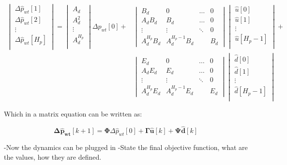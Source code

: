 \begin{align}
	\begin{vmatrix}
\Delta \hat p_{wt}[1] \\ 
\Delta \hat p_{wt}[2]\\ 
\vdots \\ 
\Delta \hat p_{wt}[H_p]\\ 
\end{vmatrix}
=
\begin{vmatrix}
A_d \\ 
A_d^2\\ 
\vdots \\ 
A_d^{H_p}\\ 
\end{vmatrix}
\Delta p_{wt}[0]+\nonumber
&\begin{vmatrix}
 B_d& 0 & \hdots  & 0\\ 
 A_dB_d&  B_d& \hdots & 0\\ 
\vdots &\vdots  & \ddots  & 0\\ 
 A_d^{H_p}B_d& A_d^{H_p-1}B_d  &  & B_d
\end{vmatrix}
\begin{vmatrix}
\hat u[0] \\ 
\hat u[1]\\ 
\vdots \\ 
\hat u[H_p-1]\\ 
\end{vmatrix}
+ \\
&\begin{vmatrix}
 E_d& 0 & \hdots  & 0\\ 
 A_dE_d&  E_d& \hdots & 0\\ 
\vdots &\vdots  & \ddots  & 0\\ 
 A_d^{H_p}E_d& A_d^{H_p-1}E_d  &  & E_d
\end{vmatrix}
\begin{vmatrix}
\hat d[0] \\ 
\hat d[1]\\ 
\vdots \\ 
\hat d[H_p-1]\\ 
\end{vmatrix} 
\end{align}

Which in a matrix equation can be written as: 

\begin{equation}
	\bm{\Delta \hat p_{wt}} [k+1] = \bm{\Phi} \Delta \hat p_{wt}[0] + \bm{\Gamma \hat{u}}[k] + \bm{\Psi} \bm{\hat{d}}[k]
\end{equation}

-Now the dynamics can be plugged in
-State the final objective function, what are the values, how they are defined. 